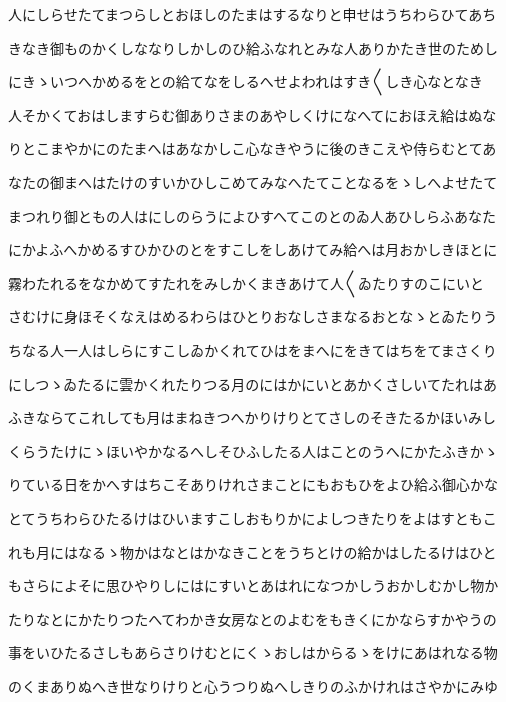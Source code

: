 \documentclass[a4paper,11pt,landscape]{ltjtarticle}
\begin{document}
\par\medskip
人にしらせたてまつらしとおほしのたまはするなりと申せはうちわらひてあち
\par\medskip
きなき御ものかくしななりしかしのひ給ふなれとみな人ありかたき世のためし
\par\medskip
にきゝいつへかめるをとの給てなをしるへせよわれはすき〱しき心なとなき
\par\medskip
人そかくておはしますらむ御ありさまのあやしくけになへてにおほえ給はぬな
\par\medskip
りとこまやかにのたまへはあなかしこ心なきやうに後のきこえや侍らむとてあ
\par\medskip
なたの御まへはたけのすいかひしこめてみなへたてことなるをゝしへよせたて
\par\medskip
まつれり御ともの人はにしのらうによひすへてこのとのゐ人あひしらふあなた
\par\medskip
にかよふへかめるすひかひのとをすこしをしあけてみ給へは月おかしきほとに
\par\medskip
霧わたれるをなかめてすたれをみしかくまきあけて人〱ゐたりすのこにいと
\par\medskip
さむけに身ほそくなえはめるわらはひとりおなしさまなるおとなゝとゐたりう
\par\medskip
ちなる人一人はしらにすこしゐかくれてひはをまへにをきてはちをてまさくり
\par\medskip
にしつゝゐたるに雲かくれたりつる月のにはかにいとあかくさしいてたれはあ
\par\medskip
ふきならてこれしても月はまねきつへかりけりとてさしのそきたるかほいみし
\par\medskip
くらうたけにゝほいやかなるへしそひふしたる人はことのうへにかたふきかゝ
\par\medskip
りている日をかへすはちこそありけれさまことにもおもひをよひ給ふ御心かな
\par\medskip
とてうちわらひたるけはひいますこしおもりかによしつきたりをよはすともこ
\par\medskip
れも月にはなるゝ物かはなとはかなきことをうちとけの給かはしたるけはひと
\par\medskip
もさらによそに思ひやりしにはにすいとあはれになつかしうおかしむかし物か
\par\medskip
たりなとにかたりつたへてわかき女房なとのよむをもきくにかならすかやうの
\par\medskip
事をいひたるさしもあらさりけむとにくゝおしはからるゝをけにあはれなる物
\par\medskip
のくまありぬへき世なりけりと心うつりぬへしきりのふかけれはさやかにみゆ
\end{document}
